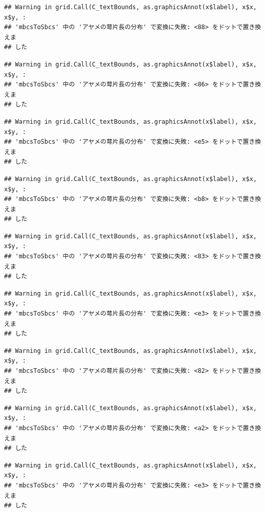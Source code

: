 \documentclass[
]{book}
\begin{document}
\begin{verbatim}
## Warning in grid.Call(C_textBounds, as.graphicsAnnot(x$label), x$x, x$y, :
## 'mbcsToSbcs' 中の 'アヤメの萼片長の分布' で変換に失敗: <88> をドットで置き換えま
## した
\end{verbatim}

\begin{verbatim}
## Warning in grid.Call(C_textBounds, as.graphicsAnnot(x$label), x$x, x$y, :
## 'mbcsToSbcs' 中の 'アヤメの萼片長の分布' で変換に失敗: <86> をドットで置き換えま
## した
\end{verbatim}

\begin{verbatim}
## Warning in grid.Call(C_textBounds, as.graphicsAnnot(x$label), x$x, x$y, :
## 'mbcsToSbcs' 中の 'アヤメの萼片長の分布' で変換に失敗: <e5> をドットで置き換えま
## した
\end{verbatim}

\begin{verbatim}
## Warning in grid.Call(C_textBounds, as.graphicsAnnot(x$label), x$x, x$y, :
## 'mbcsToSbcs' 中の 'アヤメの萼片長の分布' で変換に失敗: <b8> をドットで置き換えま
## した
\end{verbatim}

\begin{verbatim}
## Warning in grid.Call(C_textBounds, as.graphicsAnnot(x$label), x$x, x$y, :
## 'mbcsToSbcs' 中の 'アヤメの萼片長の分布' で変換に失敗: <83> をドットで置き換えま
## した
\end{verbatim}

\begin{verbatim}
## Warning in grid.Call(C_textBounds, as.graphicsAnnot(x$label), x$x, x$y, :
## 'mbcsToSbcs' 中の 'アヤメの萼片長の分布' で変換に失敗: <e3> をドットで置き換えま
## した
\end{verbatim}

\begin{verbatim}
## Warning in grid.Call(C_textBounds, as.graphicsAnnot(x$label), x$x, x$y, :
## 'mbcsToSbcs' 中の 'アヤメの萼片長の分布' で変換に失敗: <82> をドットで置き換えま
## した
\end{verbatim}

\begin{verbatim}
## Warning in grid.Call(C_textBounds, as.graphicsAnnot(x$label), x$x, x$y, :
## 'mbcsToSbcs' 中の 'アヤメの萼片長の分布' で変換に失敗: <a2> をドットで置き換えま
## した
\end{verbatim}

\begin{verbatim}
## Warning in grid.Call(C_textBounds, as.graphicsAnnot(x$label), x$x, x$y, :
## 'mbcsToSbcs' 中の 'アヤメの萼片長の分布' で変換に失敗: <e3> をドットで置き換えま
## した
\end{verbatim}
\end{document}

